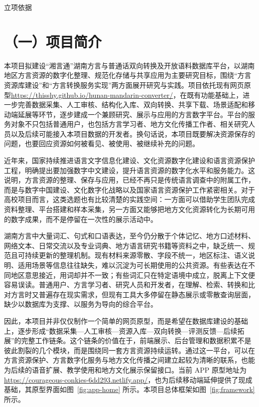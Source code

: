 \documentclass[UTF8]{ctexart}
\begin{document}
\begin{center}
  {\heiti{} 立项依据\par}
\end{center}
\vspace{1em}

\section*{（一）项目简介}

本项目拟建设“湘言通”湖南方言与普通话双向转换及开放语料数据库平台，以湖南地区方言资源的数字化整理、规范化存储与共享应用为主要研究目标，围绕“方言资源库建设”和“方言转换服务实现”两方面展开研究与实践。项目依托现有网页原型\url{https://thisshy.github.io/hunan-mandarin-converter/}，在既有功能基础上，进一步完善数据采集、人工审核、结构化入库、双向转换、共享下载、场景适配和移动端延展等环节，逐步建成一个兼顾研究、展示与应用的方言数字平台。平台的服务对象不只包括普通用户，也包括方言学习者、地方文化传播工作者、相关研究人员以及后续可能接入本项目数据的开发者。换句话说，本项目既要解决资源保存的问题，也要回应资源如何被看见、被使用、被继续补充的问题。

近年来，国家持续推进语言文字信息化建设、文化资源数字化建设和语言资源保护工程，明确提出要加强数字中文建设，提升语言资源的数字化水平和服务能力\cite{jiaoyubu2025shuzi,quanguorenda2000putonghua,zhongxuan2022wenhua,zhonggong2023shuzi,jiaoyubu2024baohu}。这说明，方言资源的整理、保存与应用，已经不再只是传统语言调查中的附属工作，而是与数字中国建设、文化数字化战略以及国家语言资源保护工作紧密相关。对于高校项目而言，这类选题也有比较清楚的实践空间：一方面可以借助学生团队完成资料整理、平台搭建和样本采集，另一方面又能够把地方文化资源转化为长期可用的数字成果，而不是停留在一次性的展示活动中。

湖南方言中大量词汇、句式和口语表达，至今仍分散于个体记忆、地方口述材料、网络文本、日常交流以及专业词典、地方语言研究书籍等资料之中，缺乏统一、规范且可持续更新的整理机制。现有材料来源零散、字段不统一，地区标注、语义说明、适用场景等信息往往缺失，难以沉淀为可长期使用的公共资源。有些表达在不同地区意思接近，用词却并不一致；有些词汇只在特定语境中成立，脱离上下文便容易误读。普通用户、方言学习者、研究人员和开发者，在理解、检索、转换和比对方言时又普遍存在现实需求，但现有工具大多停留在静态展示或零散查询层面，缺少以数据库为支撑、以服务为导向的综合平台。

因此，本项目并非仅仅制作一个简单的网页原型，而是希望在数据库建设的基础上，逐步形成“数据采集—人工审核—资源入库—双向转换—评测反馈—后续拓展”的完整工作链条。这个链条的价值在于，前端展示、后台管理和数据积累不是彼此割裂的几个模块，而是围绕同一套方言资源持续运转。通过这一平台，可以在方言资源保护、方言数字化服务与地方文化传播之间建立起较为清晰的联系，也能为后续的语音扩展、教学使用和地方文化展示保留接口。当前 APP 原型地址为 \url{https://courageous-conkies-6dd293.netlify.app/}，也为后续移动端延伸提供了现成基础，其原型界面如图~\ref{fig:app-home} 所示。本项目总体框架如图~\ref{fig:framework} 所示。
\end{document}
